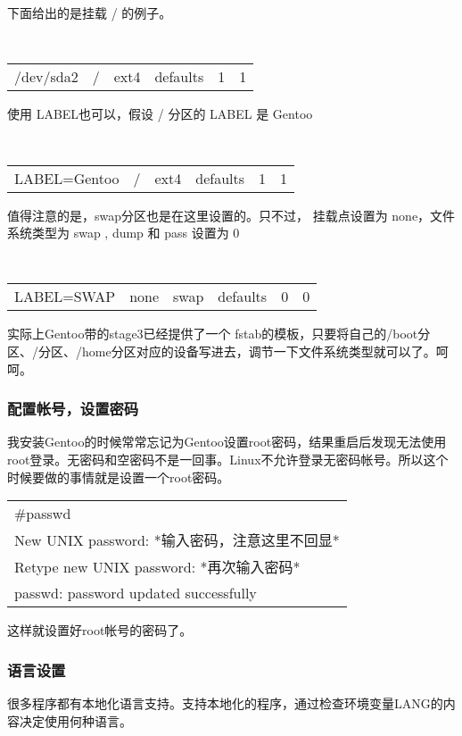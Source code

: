 \documentclass[amstex,twoside]{ctexbook}
\newenvironment{code}{\small\tt\begin{longtable}{p{0.8\textwidth}}}{\end{longtable}}
\begin{document}
下面给出的是挂载 / 的例子。
\begin{small}
\tt 
\begin{longtable}{cccccc}
/dev/sda2	& /	 & ext4	& defaults & 1 & 1
\end{longtable}
\end{small}

使用 LABEL也可以，假设 / 分区的 LABEL 是 Gentoo

\begin{small}
\tt 
\begin{longtable}{cccccc}
LABEL=Gentoo	& /	 & ext4	& defaults & 1 & 1
\end{longtable}
\end{small}

值得注意的是，swap分区也是在这里设置的。只不过， 挂载点设置为 none，文件系统类型为 swap , dump 和 pass 设置为 0 

\begin{small}
\tt 
\begin{longtable}{cccccc}
LABEL=SWAP	& none	 & swap	& defaults & 0 & 0
\end{longtable}
\end{small}

实际上Gentoo带的stage3已经提供了一个 fstab的模板，只要将自己的/boot分区、/分区、/home分区对应的设备写进去，调节一下文件系统类型就可以了。呵呵。


\subsubsection{配置帐号，设置密码}

我安装Gentoo的时候常常忘记为Gentoo设置root密码，结果重启后发现无法使用root登录。无密码和空密码不是一回事。Linux不允许登录无密码帐号。所以这个时候要做的事情就是设置一个root密码。

\begin{code}
\#passwd\\
New UNIX password: *输入密码，注意这里不回显*\\
Retype new UNIX password: *再次输入密码*\\
passwd: password updated successfully
\end{code}

这样就设置好root帐号的密码了。

\subsubsection{语言设置}\label{sec:lang}
很多程序都有本地化语言支持。支持本地化的程序，通过检查环境变量LANG的内容决定使用何种语言。
\end{document}
